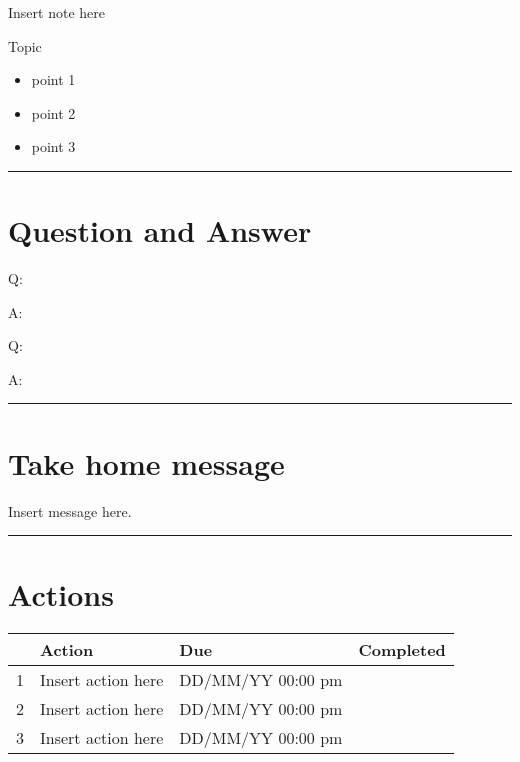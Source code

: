 \documentclass[
]{book}
\providecommand{\tightlist}{%
  \setlength{\itemsep}{0pt}\setlength{\parskip}{0pt}}
\begin{document}
Insert note here

Topic

\begin{itemize}
\tightlist
\item
  point 1
\item
  point 2
\item
  point 3
\end{itemize}

\begin{center}\rule{0.5\linewidth}{0.5pt}\end{center}

\hypertarget{question-and-answer}{%
\section*{Question and Answer}\label{question-and-answer}}

Q:

A:

Q:

A:

\begin{center}\rule{0.5\linewidth}{0.5pt}\end{center}

\hypertarget{take-home-message}{%
\section*{Take home message}\label{take-home-message}}

Insert message here.

\begin{center}\rule{0.5\linewidth}{0.5pt}\end{center}

\hypertarget{actions}{%
\section*{Actions}\label{actions}}

\begin{longtable}[]{@{}llll@{}}
\toprule
& Action & Due & Completed \\
\midrule
\endhead
1 & Insert action here & DD/MM/YY 00:00 pm & \\
2 & Insert action here & DD/MM/YY 00:00 pm & \\
3 & Insert action here & DD/MM/YY 00:00 pm & \\
\bottomrule
\end{longtable}
\end{document}
